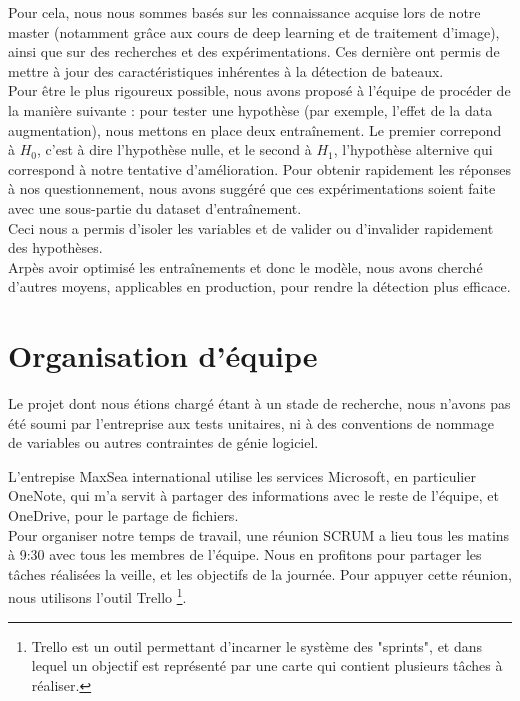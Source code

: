 Pour cela, nous nous sommes basés sur les connaissance acquise lors de notre master (notamment grâce aux cours
de deep learning et de traitement d'image), ainsi que sur des recherches et des expérimentations.
Ces dernière ont permis de mettre à jour des caractéristiques inhérentes à la détection de bateaux. \\

Pour être le plus rigoureux possible, nous avons proposé à l'équipe de procéder de la manière suivante :
pour tester une hypothèse (par exemple, l'effet de la data augmentation), nous mettons en place deux entraînement. 
Le premier correpond à \(H_{0}\), c'est à dire l'hypothèse nulle, et le second à \(H_{1}\), l'hypothèse
alternive qui correspond à notre tentative d'amélioration. Pour obtenir rapidement les réponses à 
nos questionnement, nous avons suggéré que ces expérimentations soient faite avec une sous-partie 
du dataset d'entraînement. \\

Ceci nous a permis d'isoler les variables et de valider ou d'invalider rapidement des hypothèses.\\

Arpès avoir optimisé les entraînements et donc le modèle, nous avons cherché d'autres moyens, applicables en production,
pour rendre la détection plus efficace.



\section{Organisation d'équipe}


Le projet dont nous étions chargé étant à un stade de recherche, nous n'avons 
pas été soumi par l'entreprise aux tests unitaires,
ni à des conventions de nommage de variables ou autres contraintes de génie logiciel.

L'entrepise MaxSea international utilise les services Microsoft, en particulier OneNote,
qui m'a servit à partager des informations avec le reste de l'équipe, et OneDrive,
pour le partage de fichiers.\\

Pour organiser notre temps de travail, une réunion SCRUM a lieu tous les matins à 9:30 avec
tous les membres de l'équipe. Nous en profitons pour partager les tâches réalisées la veille,
et les objectifs de la journée. Pour appuyer cette réunion, nous utilisons l'outil Trello \footnote{Trello est
un outil permettant d'incarner le système des "sprints", et dans lequel un objectif est représenté par
une carte qui contient plusieurs tâches à réaliser.}.\\

